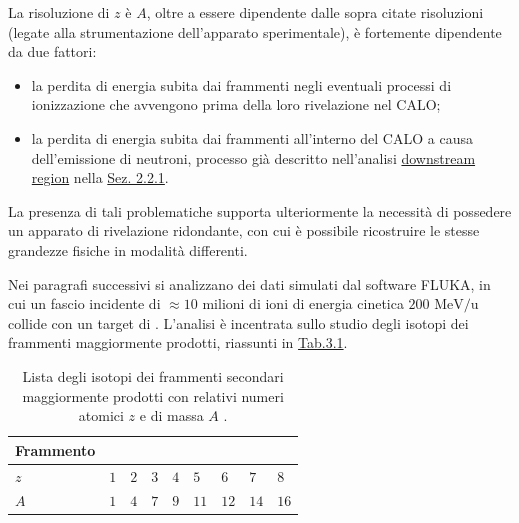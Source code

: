 \documentclass[12pt,a4paper,twoside]{report}
\begin{document}
	La risoluzione di $z$ è $A$, oltre a essere dipendente dalle sopra citate risoluzioni (legate alla strumentazione dell'apparato sperimentale), è fortemente dipendente da due fattori:
	\begin{itemize}
		\item la perdita di energia subita dai frammenti negli eventuali processi di ionizzazione che avvengono prima della loro rivelazione nel CALO;
		\item la perdita di energia subita dai frammenti all'interno del CALO a causa dell'emissione di neutroni, processo già descritto nell'analisi \hyperref[par:downstream_region]{downstream region} nella \hyperref[sec:setupElettronico]{Sez. 2.2.1}.
	\end{itemize}
	La presenza di tali problematiche supporta ulteriormente la necessità di possedere un apparato di rivelazione ridondante, con cui è possibile ricostruire le stesse grandezze fisiche in modalità differenti.
	
	Nei paragrafi successivi si analizzano dei dati simulati dal software FLUKA, in cui un fascio incidente di $\approx10$ milioni di ioni  di energia cinetica $200\mbox{ MeV/u}$ collide con un target di . L'analisi è incentrata sullo studio degli isotopi dei frammenti maggiormente prodotti, riassunti in \hyperref[tab:fragments]{Tab.3.1}.
	\begin{table}[H]
		\begin{minipage}{\textwidth}
			\centering
			\begin{tabular}{ |M{2.0cm}||M{2.0cm}|M{2.0cm}|M{2.0cm}|M{2.0cm}|M{2.0cm}|M{2.0cm}|M{2.0cm}|M{2.0cm}| }
				\hline
				Frammento &&&&&&&&\\
				\hline
				$z$ & $1$& $2$& $3$& $4$& $5$& $6$& $7$& $8$ \\
				\hline
				$A$ & $1$& $4$ &$7$ &$9$& $11$& $12$& $14$& $16$ \\
				\hline
			\end{tabular}
		\end{minipage}
		\caption{Lista degli isotopi dei frammenti secondari maggiormente prodotti con relativi numeri atomici $z$ e di massa $A$ \cite{foot_cdr}.}
		\label{tab:fragments}
	\end{table}
	
\end{document}
